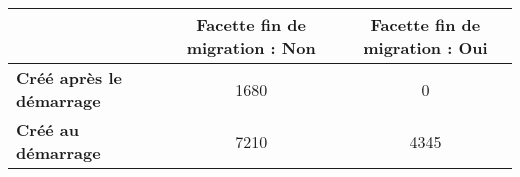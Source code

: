 \begin{tabular}{lcc}
\toprule
{} &  Facette fin de migration : Non &  Facette fin de migration : Oui \\
\midrule
\textbf{Créé après le démarrage} &                            1680 &                               0 \\
\textbf{Créé au démarrage      } &                            7210 &                            4345 \\
\bottomrule
\end{tabular}
